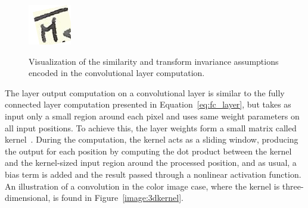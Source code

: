 \documentclass[english,twoside,openright]{UH_DS_MSc}
\begin{document}
\begin{figure}[ht]
{\begin{minipage}[b]{0.45\linewidth}
            \includegraphics[width=\textwidth]{images/rotated_molar.png}
            \label{fig:snowfall4}
        \end{minipage}
    }

    \caption{Visualization of the similarity and transform invariance assumptions encoded in the convolutional layer computation.}
    \label{fig:conv_assumptions}
\end{figure}

The layer output computation on a convolutional layer is similar to the fully connected layer computation
presented in Equation~\ref{eq:fc_layer}, but takes as input only a small region around each pixel and uses same weight parameters on all input positions. To achieve this, the layer weights form a small matrix called kernel~\cite{princebook}. During the computation, the kernel 
acts as a sliding window, producing the output for each position by computing the dot product between the kernel and the kernel-sized input region around the processed position, and as usual, a bias term is added and the result passed  through a nonlinear activation function. An illustration of a convolution in the color image case, where the kernel is three-dimensional,
is found in Figure~\ref{image:3dkernel}.
\end{document}
